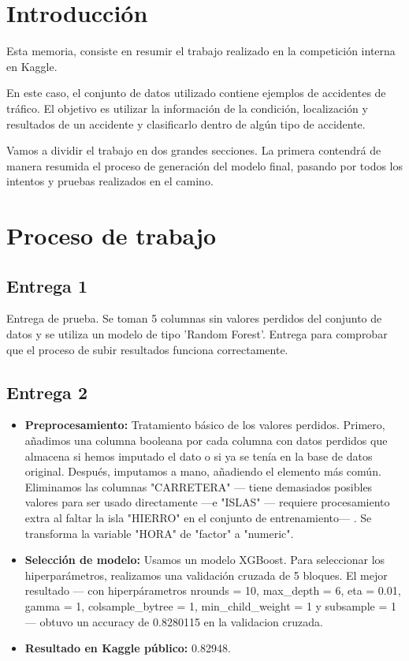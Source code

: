 \section{Introducción}
Esta memoria, consiste en resumir el trabajo realizado en la competición interna en Kaggle. 

En este caso, el conjunto de datos utilizado contiene ejemplos de accidentes de tráfico. El objetivo es utilizar la información de la condición, localización y resultados de un accidente y clasificarlo dentro de algún tipo de accidente.

Vamos a dividir el trabajo en dos grandes secciones. La primera contendrá de manera resumida el proceso de generación del modelo final, pasando por todos los intentos y pruebas realizados en el camino.
\section{Proceso de trabajo}

\subsection{Entrega 1}

Entrega de prueba. Se toman 5 columnas sin valores perdidos del conjunto de datos y se utiliza un modelo de tipo 'Random Forest'. Entrega para comprobar que el proceso de subir resultados funciona correctamente.

\subsection{Entrega 2}
\begin{itemize}
\item \textbf{Preprocesamiento:} Tratamiento básico de los valores perdidos. Primero, añadimos una columna booleana por cada columna con datos perdidos que almacena si hemos imputado el dato o si ya se tenía en la base de datos original. Después, imputamos a mano, añadiendo el elemento más común. Eliminamos las columnas "CARRETERA" --- tiene demasiados posibles valores para ser usado directamente ---e "ISLAS" --- requiere procesamiento extra al faltar la isla "HIERRO" en el conjunto de entrenamiento--- . Se transforma la variable "HORA" de "factor" a "numeric".
\item \textbf{Selección de modelo:} Usamos un modelo XGBoost. Para seleccionar los hiperparámetros, realizamos una validación cruzada de 5 bloques. El mejor resultado --- con hiperpárametros nrounds = 10, max\_depth = 6, eta = 0.01, gamma = 1, colsample\_bytree = 1, min\_child\_weight = 1 y subsample = 1 --- obtuvo un accuracy de 0.8280115 en la validacion cruzada.
\item \textbf{Resultado en Kaggle público:} 0.82948.
\end{itemize}

